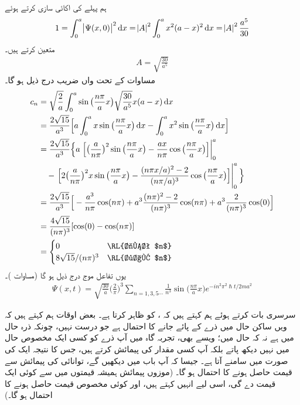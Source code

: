 ہم پہلے  کی اکائی سازی کرتے ہوئے 
\begin{align*}
1=\int_{0}^{a}\abs{\Psi(x,0)}^{2}\dif{x}=\abs{A}^{2}\int_{0}^{a}x^{2}(a-x)^{2}\dif{x}=\abs{A}^{2}\frac{a^{5}}{30}
\end{align*}
 متعین کرتے ہیں۔ 
\begin{align*}
A=\sqrt{\frac{30}{a^{5}}}
\end{align*}
مساوات  کے تحت   واں  ضریب  درج ذیل ہو گا۔
\begin{align*}
c_{n}&=\sqrt{\frac{2}{a}}\int_{0}^{a}\sin\big(\frac{n\pi}{a}x\big)\sqrt{\frac{30}{a^{5}}}x(a-x)\dif{x}\\
&=\frac{2\sqrt{15}}{a^{3}}\Big[a\int_{0}^{a}x\sin\big(\frac{n\pi}{a}x\big)\dif{x}-\int_{0}^{a}x^{2}\sin\big(\frac{n\pi}{a}x\big)\dif x\Big]\\
&=\frac{2\sqrt{15}}{a^{3}}\Big\{a \left .\Big[\big(\frac{a}{n\pi}\big)^{2}\sin\big(\frac{n\pi}{a}x\big)-\frac{ax}{n\pi}\cos\big(\frac{n\pi}{a}x\big)\Big]\right\vert_{0}^{a} \\
&\quad-\left .\Big[2\big(\frac{a}{n\pi}\big)^{2}x\sin\big(\frac{n\pi}{a}x\big)-\frac{(n\pi x/a)^{2}-2}{(n\pi/a)^{3}}\cos\big(\frac{n\pi}{a}x\big)\Big]\right\vert_{0}^{a}\Big\} \\
&=\frac{2\sqrt{15}}{a^{3}}\Big[-\frac{a^{3}}{n\pi}\cos(n\pi)+a^{3}\frac{(n\pi)^{2}-2}{(n\pi)^{3}}\cos(n\pi)+a^{3}\frac{2}{(n\pi)^{3}}\cos(0)\Big]\\
&=\frac{4\sqrt{15}}{(n\pi)^{3}}[\cos(0)-\cos(n\pi)]\\
&=\begin{cases}
0 & \text{\RL{جفت $n$}}\\
8\sqrt{15}/(n\pi)^{3}& \text{\RL{طاق $n$}}
\end{cases}
\end{align*}
یوں تفاعل موج درج ذیل ہو گا (مساوات )۔
 \begin{align*}
\Psi(x,t)=\sqrt{\frac{30}{a}}\big(\frac{2}{\pi}\big)^3\sum_{n=1,3,5\cdots}\frac{1}{n^3}\sin\big(\frac{n\pi}{a}x\big)e^{-in^{2}\pi^{2}\hslash t/2ma^{2}}
\end{align*}

سرسری  بات کرتے ہوئے ہم کہتے ہیں کہ ،  کو ظاہر کرتا ہے۔ بعض اوقات ہم کہتے ہیں کہ  ویں ساکن حال میں  ذرے کے پائے جانے کا احتمال  ہے جو درست نہیں، چونکہ ذرہ حال  میں ہے نہ کہ حال  میں؛ ویسے بھی، تجربہ گاہ میں آپ ذرے کو کسی ایک مخصوص حال میں نہیں دیکھ پاتے بلکہ آپ کسی  مقدار کی پیمائش کرتے ہیں، جس کا نتیجہ ایک  کی صورت میں سامنے آتا ہے۔ جیسا کہ آپ باب  میں دیکھیں گے، توانائی کی پیمائش سے  قیمت حاصل ہونے کا احتمال  ہو گا۔ (موزوں پیمائش ہمیشہ  قیمتوں میں سے کوئی ایک قیمت دے گی، اسی لیے انہیں کہتے ہیں، اور کوئی مخصوص قیمت  حاصل ہونے کا احتمال  ہو گا۔)

